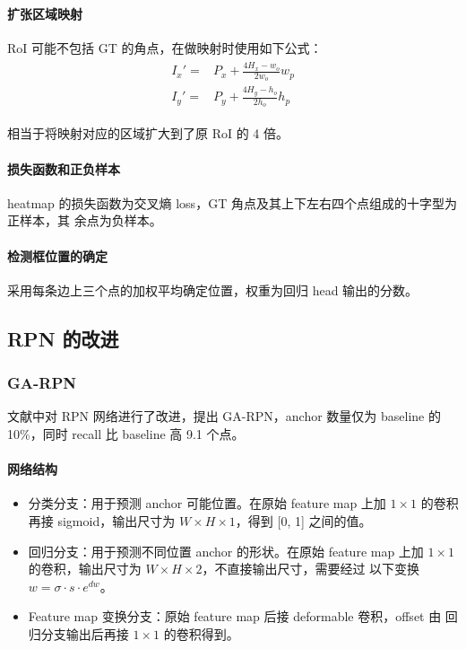 \paragraph{扩张区域映射}
RoI 可能不包括 GT 的角点，在做映射时使用如下公式：
\begin{align}
  \label{equ:yolo-v1-loss}
  \begin{split}
    I_x' = & P_x + \frac{4H_{x} - w_o}{2w_o} w_p  \\
    I_y' = & P_y + \frac{4H_{y} - h_o}{2h_o} h_p
  \end{split}
\end{align}

相当于将映射对应的区域扩大到了原 RoI 的 4 倍。

\paragraph{损失函数和正负样本}
heatmap 的损失函数为交叉熵 loss，GT 角点及其上下左右四个点组成的十字型为正样本，其
余点为负样本。

\paragraph{检测框位置的确定}
采用每条边上三个点的加权平均确定位置，权重为回归 head 输出的分数。

\subsection{RPN 的改进}
\subsubsection{GA-RPN}
\label{subsubsec:GA-RPN}
文献中对 RPN 网络进行了改进，提出 GA-RPN，anchor 数量仅为 baseline
的 10\%，同时 recall 比 baseline 高 9.1 个点。

\paragraph{网络结构}

\begin{itemize}
  \item 分类分支：用于预测 anchor 可能位置。在原始 feature map 上加 $1 \times 1$
    的卷积再接 sigmoid，输出尺寸为 $W \times H \times 1$，得到 [0, 1] 之间的值。
  \item 回归分支：用于预测不同位置 anchor 的形状。在原始 feature map 上加 $1
    \times 1$的卷积，输出尺寸为 $W \times H \times 2$，不直接输出尺寸，需要经过
    以下变换 $w = \sigma \cdot s \cdot e^{dw}$。
  \item Feature map 变换分支：原始 feature map 后接 deformable 卷积，offset 由
    回归分支输出后再接 $1 \times 1$ 的卷积得到。
\end{itemize}


